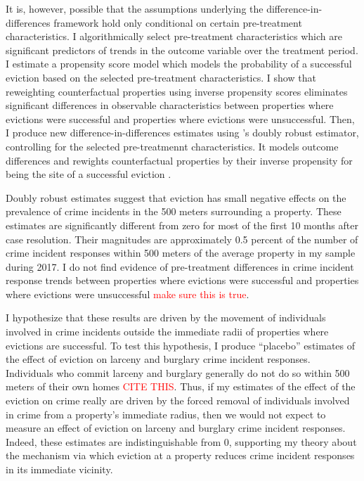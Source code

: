 \documentclass[12pt]{article}
\begin{document}
It is, however, possible that the assumptions underlying the difference-in-differences framework hold only conditional on certain pre-treatment characteristics. I algorithmically select pre-treatment characteristics which are significant predictors of trends in the outcome variable over the treatment period. I estimate a propensity score model which models the probability of a successful eviction based on the selected pre-treatment characteristics. I show that reweighting counterfactual properties using inverse propensity scores eliminates significant differences in observable characteristics between properties where evictions were successful and properties where evictions were unsuccessful. Then, I produce new difference-in-differences estimates using \cite{santanna_doubly_2020}'s doubly robust estimator, controlling for the selected pre-treatmennt characteristics. It models outcome differences and rewights counterfactual properties by their inverse propensity for being the site of a successful eviction \citep{santanna_doubly_2020}. 


Doubly robust estimates suggest that eviction has small negative effects on the prevalence of crime incidents in the 500 meters surrounding a property. These estimates are significantly different from zero for most of the first 10 months after case resolution. Their magnitudes are approximately 0.5 percent of the number of crime incident responses within 500 meters of the average property in my sample during 2017. I do not find evidence of pre-treatment differences in crime incident response trends between properties where evictions were successful and properties where evictions were unsuccessful \textcolor{red}{make sure this is true}.

I hypothesize that these results are driven by the movement of individuals involved in crime incidents outside the immediate radii of properties where evictions are successful. To test this hypothesis, I produce ``placebo'' estimates of the effect of eviction on larceny and burglary crime incident responses. Individuals who commit larceny and burglary generally do not do so within 500 meters of their own homes \textcolor{red}{CITE THIS}. Thus, if my estimates of the effect of the eviction on crime really are driven by the forced removal of individuals involved in crime from a property's immediate radius, then we would not expect to measure an effect of eviction on larceny and burglary crime incident responses. Indeed, these estimates are indistinguishable from 0, supporting my theory about the mechanism via which eviction at a property reduces crime incident responses in its immediate vicinity.
\end{document}

